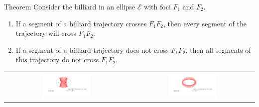 \documentclass[compress,aspectratio=169,10pt,usenames,dvipsnames]{beamer}
\begin{document}

\begin{frame}

\begin{block}{Theorem}
Consider the billiard in an ellipse $\mathcal{E}$ with foci $F_1$ and $F_2$. %
\begin{enumerate}
\item If a segment of a billiard trajectory crosses $F_1F_2$, then every segment of the trajectory will cross $F_1F_2$. 
\item If a segment of a billiard trajectory does not cross $F_1F_2$, then all segments of this trajectory do not cross $F_1F_2$. 
\end{enumerate}
\end{block}

\begin{center}
\begin{tabular}{c c}
\includegraphics[width=0.4\textwidth]{EllBillHyp} & \includegraphics[width=0.4\textwidth]{EllBillEll}
\end{tabular}
\end{center}


\end{frame}

\end{document}
